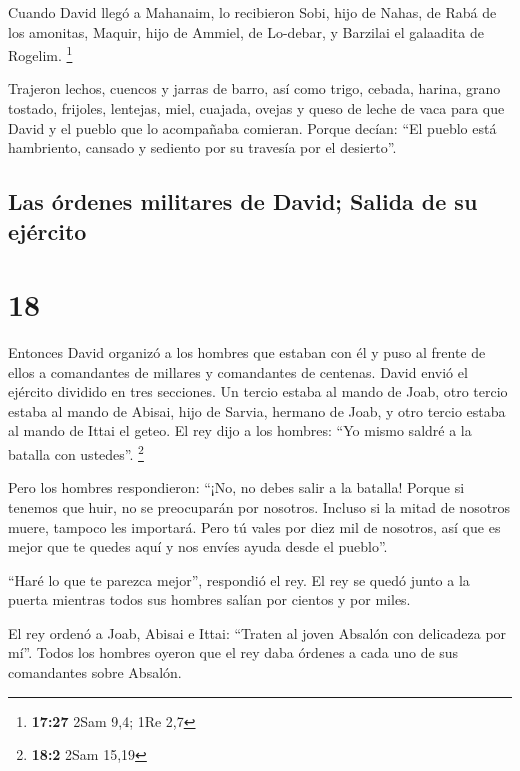  Cuando David llegó a Mahanaim, lo recibieron Sobi, hijo
de Nahas, de Rabá de los amonitas, Maquir, hijo de Ammiel, de Lo-debar,
y Barzilai el galaadita de Rogelim. \footnote{\textbf{17:27} 2Sam 9,4;
  1Re 2,7}

 Trajeron lechos, cuencos y jarras de barro, así como
trigo, cebada, harina, grano tostado, frijoles, lentejas,
 miel, cuajada, ovejas y queso de leche de vaca para que
David y el pueblo que lo acompañaba comieran. Porque decían: ``El pueblo
está hambriento, cansado y sediento por su travesía por el desierto''.

\hypertarget{las-uxf3rdenes-militares-de-david-salida-de-su-ejuxe9rcito}{%
\subsection{Las órdenes militares de David; Salida de su
ejército}\label{las-uxf3rdenes-militares-de-david-salida-de-su-ejuxe9rcito}}

\hypertarget{section-17}{%
\section{18}\label{section-17}}

 Entonces David organizó a los hombres que estaban con él
y puso al frente de ellos a comandantes de millares y comandantes de
centenas.  David envió el ejército dividido en tres
secciones. Un tercio estaba al mando de Joab, otro tercio estaba al
mando de Abisai, hijo de Sarvia, hermano de Joab, y otro tercio estaba
al mando de Ittai el geteo. El rey dijo a los hombres: ``Yo mismo saldré
a la batalla con ustedes''. \footnote{\textbf{18:2} 2Sam 15,19}

 Pero los hombres respondieron: ``¡No, no debes salir a la
batalla! Porque si tenemos que huir, no se preocuparán por nosotros.
Incluso si la mitad de nosotros muere, tampoco les importará. Pero tú
vales por diez mil de nosotros, así que es mejor que te quedes aquí y
nos envíes ayuda desde el pueblo''.

 ``Haré lo que te parezca mejor'', respondió el rey. El
rey se quedó junto a la puerta mientras todos sus hombres salían por
cientos y por miles.

 El rey ordenó a Joab, Abisai e Ittai: ``Traten al joven
Absalón con delicadeza por mí''. Todos los hombres oyeron que el rey
daba órdenes a cada uno de sus comandantes sobre Absalón.

